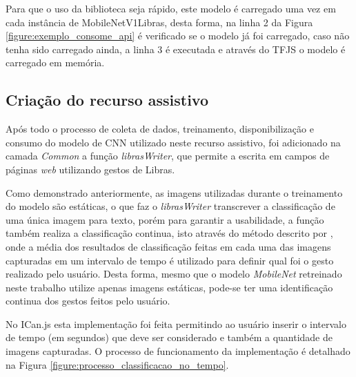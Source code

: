 \par Para que o uso da biblioteca seja rápido, este modelo é carregado uma vez em cada instância de MobileNetV1Libras, desta forma, na linha 2 da Figura \ref{figure:exemplo_consome_api} é verificado se o modelo já foi carregado, caso não tenha sido carregado ainda, a linha 3 é executada e através do TFJS o modelo é carregado em memória.

\subsection{Criação do recurso assistivo}

\par Após todo o processo de coleta de dados, treinamento, disponibilização e consumo do modelo de CNN utilizado neste recurso assistivo, foi adicionado na camada \textit{Common} a função \textit{librasWriter}, que permite a escrita em campos de páginas \textit{web} utilizando gestos de Libras.

\par Como demonstrado anteriormente, as imagens utilizadas durante o treinamento do modelo são estáticas, o que faz o \textit{librasWriter} transcrever a classificação de uma única imagem para texto, porém para garantir a usabilidade, a função também realiza a classificação continua, isto através do método descrito por , onde a média dos resultados de classificação feitas em cada uma das imagens capturadas em um intervalo de tempo é utilizado para definir qual foi o gesto realizado pelo usuário. Desta forma, mesmo que o modelo \textit{MobileNet} retreinado neste trabalho utilize apenas imagens estáticas, pode-se ter uma identificação continua dos gestos feitos pelo usuário.

\par No ICan.js esta implementação foi feita permitindo ao usuário inserir o intervalo de tempo (em segundos) que deve ser considerado e também a quantidade de imagens capturadas. O processo de funcionamento da implementação é detalhado na Figura \ref{figure:processo_classificacao_no_tempo}.


